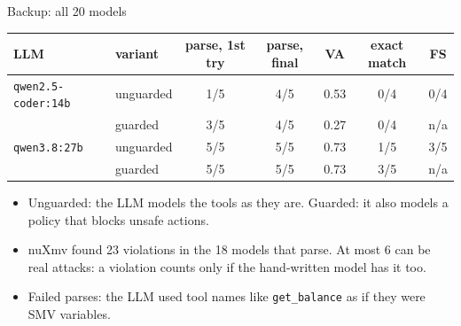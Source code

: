 \documentclass[aspectratio=169,11pt]{beamer}
\newcommand{\act}[1]{\texttt{#1}}
\begin{document}
\begin{frame}[noframenumbering]{Backup: all 20 models}
\small
\centering
\renewcommand{\arraystretch}{1.2}
\begin{tabular}{@{}llccccc@{}}
\toprule
LLM & variant & parse, 1st try & parse, final & VA & exact match & FS\\
\midrule
\act{qwen2.5-coder:14b} & unguarded & 1/5 & 4/5 & 0.53 & 0/4 & 0/4\\
                        & guarded   & 3/5 & 4/5 & 0.27 & 0/4 & n/a\\
\act{qwen3.8:27b}       & unguarded & 5/5 & 5/5 & 0.73 & 1/5 & 3/5\\
                        & guarded   & 5/5 & 5/5 & 0.73 & 3/5 & n/a\\
\bottomrule
\end{tabular}

\vspace{1em}
\raggedright
\begin{itemize}\setlength\itemsep{0.3em}
\item Unguarded: the LLM models the tools as they are. Guarded: it also models a policy that blocks
  unsafe actions.
\item nuXmv found 23 violations in the 18 models that parse. At most 6 can be real attacks: a
  violation counts only if the hand-written model has it too.
\item Failed parses: the LLM used tool names like \act{get\_balance} as if they were SMV variables.
\end{itemize}
\end{frame}
\end{document}
